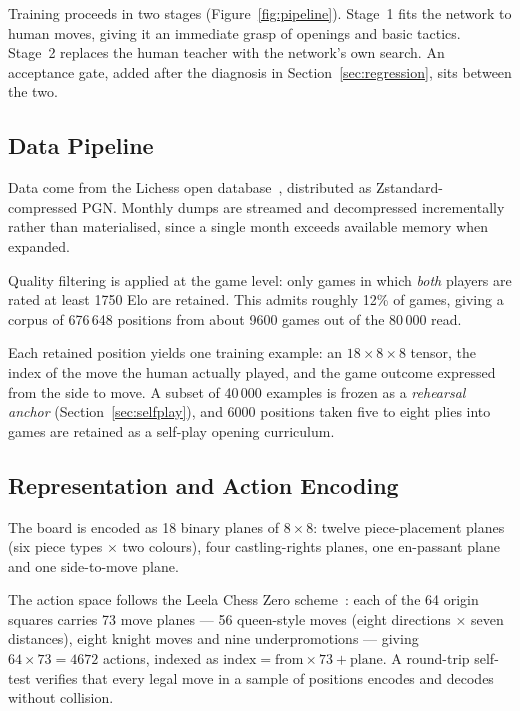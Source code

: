 \documentclass{article}
\begin{document}
Training proceeds in two stages (Figure~\ref{fig:pipeline}). Stage~1 fits the
network to human moves, giving it an immediate grasp of openings and basic
tactics. Stage~2 replaces the human teacher with the network's own search. An
acceptance gate, added after the diagnosis in Section~\ref{sec:regression},
sits between the two.

\subsection{Data Pipeline}

Data come from the Lichess open database~\cite{lichess}, distributed as
Zstandard-compressed PGN. Monthly dumps are streamed and decompressed
incrementally rather than materialised, since a single month exceeds
available memory when expanded.

Quality filtering is applied at the game level: only games in which
\emph{both} players are rated at least 1750 Elo are retained. This admits
roughly 12\% of games, giving a corpus of 676\,648 positions from about
9600 games out of the 80\,000 read.

Each retained position yields one training example: an $18\times8\times8$
tensor, the index of the move the human actually played, and the game outcome
expressed from the side to move. A subset of 40\,000 examples is frozen
as a \emph{rehearsal anchor} (Section~\ref{sec:selfplay}), and 6000
positions taken five to eight plies into games are retained as a self-play
opening curriculum.

\subsection{Representation and Action Encoding}
\label{sec:repr}

The board is encoded as 18 binary planes of $8\times8$: twelve
piece-placement planes (six piece types $\times$ two colours), four
castling-rights planes, one en-passant plane and one side-to-move plane.

The action space follows the Leela Chess Zero scheme~\cite{lczero}: each of
the 64 origin squares carries 73 move planes --- 56
queen-style moves (eight directions $\times$ seven distances), eight knight
moves and nine underpromotions --- giving $64\times73=4672$ actions, indexed
as $\text{index} = \text{from} \times 73 + \text{plane}$. A round-trip
self-test verifies that every legal move in a sample of positions encodes and
decodes without collision.
\end{document}
